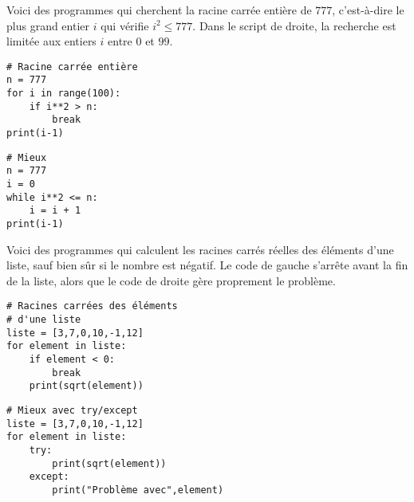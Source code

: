 \documentclass[11pt,class=report,crop=false]{standalone}
\begin{document}
\begin{cours}
\begin{exemple}

Voici des programmes qui cherchent la racine carrée entière de $777$, c'est-à-dire le plus grand entier $i$ qui vérifie $i^2 \le 777$. Dans le script de droite, la recherche est limitée aux entiers $i$ entre $0$ et $99$.

\begin{minipage}{0.4\textwidth}
\begin{lstlisting}
# Racine carrée entière
n = 777
for i in range(100):
    if i**2 > n:
        break
print(i-1)
\end{lstlisting}
\end{minipage}\qquad\qquad
\begin{minipage}{0.4\textwidth}
\begin{lstlisting}
# Mieux
n = 777
i = 0 
while i**2 <= n:
    i = i + 1
print(i-1) 
\end{lstlisting}
\end{minipage}
\end{exemple}

\begin{exemple}

Voici des programmes qui calculent les racines carrés réelles des éléments d'une liste, sauf bien sûr si le nombre est négatif. Le code de gauche s'arrête avant la fin de la liste, alors que le code de droite gère proprement le problème.

\begin{minipage}{0.4\textwidth}
\begin{lstlisting}
# Racines carrées des éléments 
# d'une liste
liste = [3,7,0,10,-1,12]
for element in liste:
    if element < 0:
        break
    print(sqrt(element))
\end{lstlisting}
\end{minipage}\qquad\qquad
\begin{minipage}{0.4\textwidth}
\begin{lstlisting}
# Mieux avec try/except
liste = [3,7,0,10,-1,12]
for element in liste:
    try: 
        print(sqrt(element))
    except:
        print("Problème avec",element)
\end{lstlisting}
\end{minipage}
\end{exemple}


\end{cours}
\end{document}
